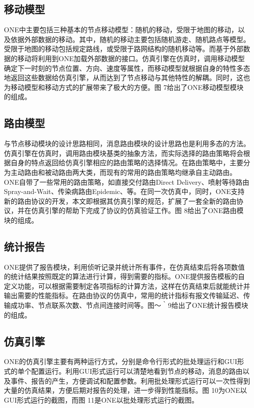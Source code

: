 \subsection{移动模型}
ONE中主要包括三种基本的节点移动模型：随机的移动，受限于地图的移动，以及依据外部数据的移动。其中，随机的移动主要包括随机游走、随机路点等模型。受限于地图的移动包括规定路线，或受限于路网结构的随机移动等。而基于外部数据的移动将利用到ONE加载外部数据的接口。仿真引擎在仿真时，调用移动模型确定下一时刻的节点位置、方向、速度等属性，而移动模型就根据自身的特性多态地返回这些数据给仿真引擎，从而达到了节点移动与其他特性的解耦。同时，这也为移动模型和移动方式的扩展带来了极大的方便。图 7给出了ONE移动模型模块的组成。

\subsection{路由模型}
与节点移动模块的设计思路相同，消息路由模块的设计思路也是利用多态的方法。仿真引擎在仿真时，调用路由模块基类的抽象方法，而实际选择的路由策略将会根据自身的特点返回给仿真引擎相应的路由策略的选择情况。在路由策略中，主要分为主动路由和被动路由两大类，而现有的常用的路由策略均继承自主动路由。ONE自带了一些常用的路由策略，如直接交付路由Direct Delivery、喷射等待路由Spray-and-Wait、传染病路由Epidemic、等。在同一次仿真中，同时，ONE支持新的路由协议的开发，本文即根据其仿真引擎的规范，扩展了一套全新的路由协议，并在仿真引擎的帮助下完成了协议的仿真验证工作。图 8给出了ONE路由模块的组成。

\subsection{统计报告}
ONE提供了报告模块，利用侦听记录并统计所有事件，在仿真结束后将各项数值的统计结果按照既定的算法进行计算，得到需要的指标。ONE提供报告模板的自定义功能，可以根据需要制定各项指标的计算方法，这样在仿真结束后就能统计并输出需要的性能指标。在路由协议的仿真中，常用的统计指标有报文传输延迟、传输成功率、节点联系次数、节点间连接时间等。图～｀9给出了ONE统计报告模块的组成。

\subsection{仿真引擎}
ONE的仿真引擎主要有两种运行方式，分别是命令行形式的批处理运行和GUI形式的单个配置运行。利用GUI形式运行可以清楚地看到节点的移动，消息的路由以及事件、报告的产生，方便调试和配置参数。利用批处理形式运行可以一次性得到大量的仿真结果，方便后期对报告的处理，进一步得到性能指标。图 10为ONE以GUI形式运行的截图，而图 11是ONE以批处理形式运行的截图。

